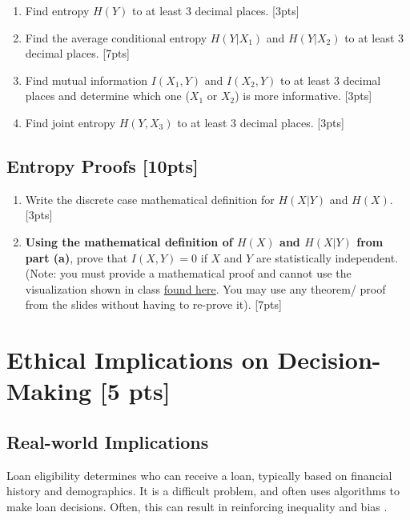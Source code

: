 \documentclass{article}
\begin{document}
\begin{enumerate}[label=(\alph*)]
    \item Find entropy $H(Y)$ to at least 3 decimal places. [3pts]
    \item Find the average conditional entropy $H(Y|X_1)$ and $H(Y|X_2)$ to at least 3 decimal places. [7pts]
    \item Find mutual information $I(X_1, Y)$ and $I(X_2, Y)$ to at least 3 decimal places and determine which one ($X_1$ or $X_2$) is more informative. [3pts]
    \item Find joint entropy $H(Y, X_3)$ to at least 3 decimal places. [3pts]
\end{enumerate}
\newpage


\subsection{Entropy Proofs [10pts]}

\begin{enumerate}[label=(\alph*)]
    \item Write the discrete case mathematical definition for $H(X|Y)$ and $H(X)$. [3pts]
    \item \textbf{Using the mathematical definition of $H(X)$ and $H(X|Y)$ from part (a)}, prove that $I(X,Y) = 0$ if $X$ and $Y$ are statistically independent. (Note: you must provide a mathematical proof and cannot use the visualization shown in class \href{https://mahdi-roozbahani.github.io/CS46417641-summer2022/other/CEandMI_Illustration.jpg}{found here}. You may use any theorem/ proof from the slides without having to re-prove it). [7pts] \\
    \newline
\end{enumerate}
\newpage

\section{Ethical Implications on Decision-Making [5 pts]}
\subsection*{Real-world Implications}
Loan eligibility determines who can receive a loan, typically based on financial history and demographics. It is a difficult problem, and often uses algorithms to make loan decisions. Often, this can result in reinforcing inequality and bias \cite{oneil}.\\
\end{document}
